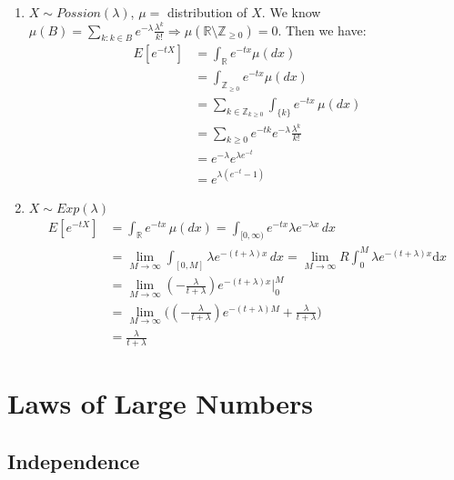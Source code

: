 \documentclass[11pt]{article}
\begin{document}
\begin{example}
    \begin{enumerate}
        \item $X \sim Possion(\lambda)$, $\mu = $ distribution of $X$.
        We know $\mu(B) = \sum_{k: k\in B} e^{-\lambda} \frac{\lambda^k}{k!} \Longrightarrow
        \mu(\mathbb{R} \setminus{\mathbb{Z}_{\ge 0}})= 0$. Then we have:
        \begin{align*}
            E[e^{-tX}] &= \int_{\mathbb{R}} e^{-tx} \mu(dx)\\
            &=\int_{\mathbb{Z}_{\ge 0}} e^{-tx} \mu(dx) \\
            &= \sum_{k \in \mathbb{Z}_{k\ge 0}} \int_{\{k\}} e^{-tx} \, \mu(dx)\\
            &= \sum_{k \ge 0} e^{-tk} e^{-\lambda} \frac{\lambda^k}{k!}\\
            &= e^{-\lambda} e^{\lambda e^{-t}} \\
            &= e^{\lambda(e^{-t}-1)}
        \end{align*}
        \item $X \sim Exp(\lambda)$
        \begin{align*}
            E[e^{-tX}] &= \int_{\mathbb{R}} e^{-tx} \, \mu(dx) = \int_{[0, \infty)} e^{-tx} \lambda e^{-\lambda x} \, dx \\
            &= \lim_{M \to \infty} \int_{[0,M]} \lambda e^{-(t+\lambda)x} \, dx = \lim_{M \to \infty}
            R \int_{0}^{M} \lambda e^{-(t+\lambda)x} \mathrm{d}x\\
            &= \lim_{M \to \infty} (-\frac{\lambda}{t+\lambda}) e^{-(t+\lambda)x} |^M_{0} \\
            &= \lim_{M \to \infty} \Big( (-\frac{\lambda}{t+\lambda}) e^{-(t+\lambda)M} + \frac{\lambda}{t+\lambda} \Big)\\
            &= \frac{\lambda}{t+\lambda}
        \end{align*}
    \end{enumerate}
\end{example}


\newpage
\section{Laws of Large Numbers}

\subsection{Independence}
\end{document}
